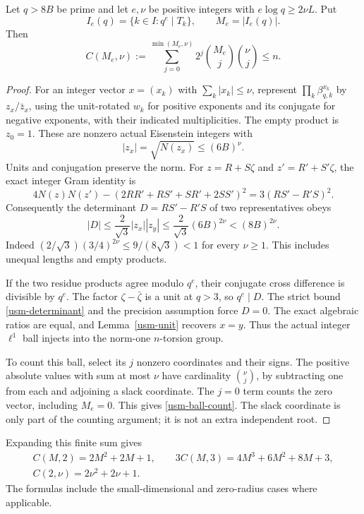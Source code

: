 \begin{theorem}\label{usm-ball}
Let \(q>8B\) be prime and let \(e,\nu\) be positive integers with
\(e\log q\geq2\nu L\). Put
\[
 I_e(q)=\{k\in I:q^e\mid T_k\},\qquad M_e=|I_e(q)|.
\]
Then
\begin{equation}\label{usm-ball-count}
 C(M_e,\nu):=\sum_{j=0}^{\min(M_e,\nu)}
    2^j\binom{M_e}{j}\binom{\nu}{j}\leq n .
\end{equation}
\end{theorem}
\begin{proof}
For an integer vector \(x=(x_k)\) with \(\sum_k|x_k|\leq\nu\),
represent \(\prod_k\beta_{q,k}^{x_k}\) by \(z_x/\bar z_x\), using
the unit-rotated \(w_k\) for positive exponents and its conjugate
for negative exponents, with their indicated multiplicities.
The empty product is \(z_0=1\). These are nonzero actual
Eisenstein integers with
\[
 |z_x|=\sqrt{N(z_x)}\leq(6B)^\nu .
\]
Units and conjugation preserve the norm. For \(z=R+S\zeta\) and
\(z'=R'+S'\zeta\), the exact integer Gram identity is
\begin{equation}\label{usm-gram}
 4N(z)N(z')-(2RR'+RS'+SR'+2SS')^2
       =3(RS'-R'S)^2 .
\end{equation}
Consequently the determinant \(D=RS'-R'S\) of two representatives
obeys
\begin{equation}\label{usm-determinant}
 |D|\leq\frac2{\sqrt3}|z_x||z_y|
 \leq\frac2{\sqrt3}(6B)^{2\nu}<(8B)^{2\nu}.
\end{equation}
Indeed \((2/\sqrt3)(3/4)^{2\nu}\leq9/(8\sqrt3)<1\) for every
\(\nu\geq1\). This includes unequal lengths and empty products.

If the two residue products agree modulo \(q^e\), their conjugate
cross difference is divisible by \(q^e\). The factor
\(\zeta-\bar\zeta\) is a unit at \(q>3\), so \(q^e\mid D\).
The strict bound \eqref{usm-determinant} and the precision
assumption force \(D=0\). The exact algebraic ratios are equal,
and Lemma~\ref{usm-unit} recovers \(x=y\). Thus the actual integer
\(\ell^1\) ball injects into the norm-one \(n\)-torsion group.

To count this ball, select its \(j\) nonzero coordinates and
their signs. The positive absolute values with sum at most
\(\nu\) have cardinality \(\binom{\nu}{j}\), by subtracting one
from each and adjoining a slack coordinate. The \(j=0\) term
counts the zero vector, including \(M_e=0\). This gives
\eqref{usm-ball-count}. The slack coordinate is only part of
the counting argument; it is not an extra independent root.
\end{proof}
Expanding this finite sum gives
\begin{equation}\label{usm-special-counts}
 \begin{gathered}
 C(M,2)=2M^2+2M+1,\qquad
 3C(M,3)=4M^3+6M^2+8M+3,\\
 C(2,\nu)=2\nu^2+2\nu+1 .
 \end{gathered}
\end{equation}
The formulas include the small-dimensional and zero-radius cases
where applicable.

